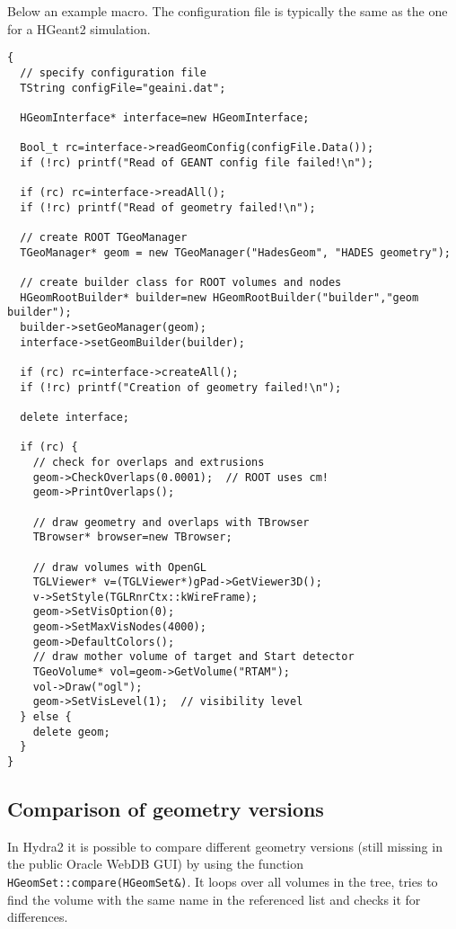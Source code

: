 Below an example macro. The configuration file is typically the same as the one for a HGeant2 simulation.
\begin{lstlisting}
{
  // specify configuration file
  TString configFile="geaini.dat";

  HGeomInterface* interface=new HGeomInterface;

  Bool_t rc=interface->readGeomConfig(configFile.Data());
  if (!rc) printf("Read of GEANT config file failed!\n");

  if (rc) rc=interface->readAll();
  if (!rc) printf("Read of geometry failed!\n");

  // create ROOT TGeoManager
  TGeoManager* geom = new TGeoManager("HadesGeom", "HADES geometry");

  // create builder class for ROOT volumes and nodes
  HGeomRootBuilder* builder=new HGeomRootBuilder("builder","geom builder");
  builder->setGeoManager(geom);
  interface->setGeomBuilder(builder);

  if (rc) rc=interface->createAll();
  if (!rc) printf("Creation of geometry failed!\n");

  delete interface;

  if (rc) {
    // check for overlaps and extrusions
    geom->CheckOverlaps(0.0001);  // ROOT uses cm!
    geom->PrintOverlaps();

    // draw geometry and overlaps with TBrowser 
    TBrowser* browser=new TBrowser;

    // draw volumes with OpenGL
    TGLViewer* v=(TGLViewer*)gPad->GetViewer3D();
    v->SetStyle(TGLRnrCtx::kWireFrame);
    geom->SetVisOption(0);
    geom->SetMaxVisNodes(4000);
    geom->DefaultColors();
    // draw mother volume of target and Start detector
    TGeoVolume* vol=geom->GetVolume("RTAM"); 
    vol->Draw("ogl");
    geom->SetVisLevel(1);  // visibility level
  } else {
    delete geom;
  }
}
\end{lstlisting}

\newpage
\subsection[Comparison of geometry versions]{Comparison of geometry versions}

In Hydra2 it is possible to compare different geometry versions (still missing in the public Oracle WebDB GUI) by using  
the function \verb+HGeomSet::compare(HGeomSet&)+. It loops over all volumes in the tree, tries to find the volume with the 
same name in the referenced list and checks it for differences.\\

